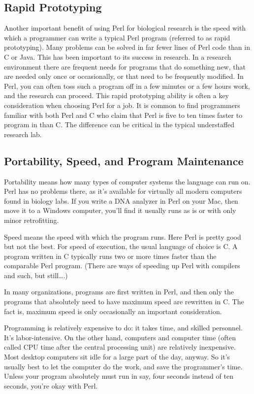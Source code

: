 \subsection{Rapid Prototyping}
Another important benefit of using Perl for biological research is the speed with which a programmer can write a typical Perl program (referred to as rapid prototyping). Many problems can be solved in far fewer lines of Perl code than in C or Java. This has been important to its success in research. In a research environment there are frequent needs for programs that do something new, that are needed only once or occasionally, or that need to be frequently modified. In Perl, you can often toss such a program off in a few minutes or a few hours work, and the research can proceed. This rapid prototyping ability is often a key consideration when choosing Perl for a job. It is common to find programmers familiar with both Perl and C who claim that Perl is five to ten times faster to program in than C. The difference can be critical in the typical understaffed research lab.

\subsection{Portability, Speed, and Program Maintenance}
Portability means how many types of computer systems the language can run on. Perl has no problems there, as it's available for virtually all modern computers found in biology labs. If you write a DNA analyzer in Perl on your Mac, then move it to a Windows computer, you'll find it usually runs as is or with only minor retrofitting.

Speed means the speed with which the program runs. Here Perl is pretty good but not the best. For speed of execution, the usual language of choice is C. A program written in C typically runs two or more times faster than the comparable Perl program. (There are ways of speeding up Perl with compilers and such, but still\ldots .)

In many organizations, programs are first written in Perl, and then only the programs that absolutely need to have maximum speed are rewritten in C. The fact is, maximum speed is only occasionally an important consideration.

Programming is relatively expensive to do: it takes time, and skilled personnel. It's labor-intensive. On the other hand, computers and computer time (often called CPU time after the central processing unit) are relatively inexpensive. Most desktop computers sit idle for a large part of the day, anyway. So it's usually best to let the computer do the work, and save the programmer's time. Unless your program absolutely must run in say, four seconds instead of ten seconds, you're okay with Perl.

